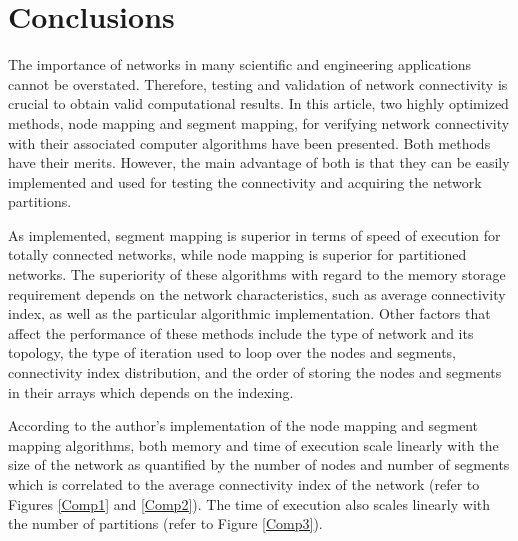 \documentclass[a4paper,12pt]{article}
\begin{document}
\clearpage
\section{Conclusions}

The importance of networks in many scientific and engineering applications cannot be overstated.
Therefore, testing and validation of network connectivity is crucial to obtain valid computational
results. In this article, two highly optimized methods, node mapping and segment mapping, for
verifying network connectivity with their associated computer algorithms have been presented. Both
methods have their merits. However, the main advantage of both is that they can be easily
implemented and used for testing the connectivity and acquiring the network partitions.

As implemented, segment mapping is superior in terms of speed of execution for totally connected
networks, while node mapping is superior for partitioned networks. The superiority of these
algorithms with regard to the memory storage requirement depends on the network characteristics,
such as average connectivity index, as well as the particular algorithmic implementation. Other
factors that affect the performance of these methods include the type of network and its topology,
the type of iteration used to loop over the nodes and segments, connectivity index distribution,
and the order of storing the nodes and segments in their arrays which depends on the indexing.

According to the author's implementation of the node mapping and segment mapping algorithms, both
memory and time of execution scale linearly with the size of the network as quantified by the
number of nodes and number of segments which is correlated to the average connectivity index of the
network (refer to Figures \ref{Comp1} and \ref{Comp2}). The time of execution also scales linearly
with the number of partitions (refer to Figure \ref{Comp3}).


\newpage
{} {} 
\end{document}
